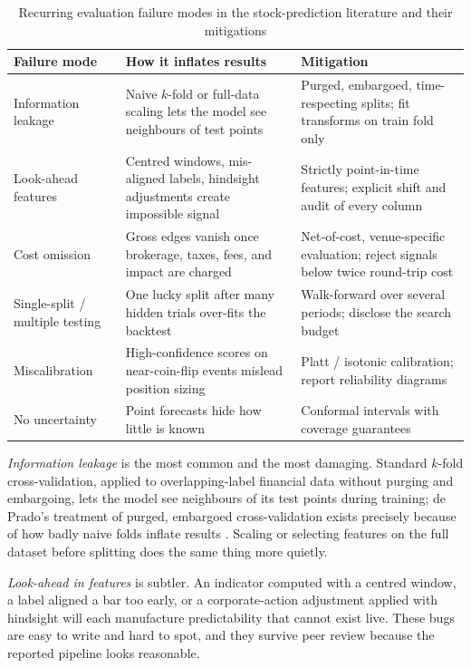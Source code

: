 \documentclass[10pt,a4paper,twocolumn]{article}
\begin{document}
\begin{table}[t]
\centering
\caption{Recurring evaluation failure modes in the stock-prediction literature and their mitigations}
\label{tab:pitfalls}
{\footnotesize
\begin{tabular}{p{3.2cm} p{6.0cm} p{6.2cm}}
\toprule
\textbf{Failure mode} & \textbf{How it inflates results} & \textbf{Mitigation} \\
\midrule
Information leakage & Naive $k$-fold or full-data scaling lets the model see neighbours of test points & Purged, embargoed, time-respecting splits; fit transforms on train fold only \cite{lopezdeprado2018} \\
Look-ahead features & Centred windows, mis-aligned labels, hindsight adjustments create impossible signal & Strictly point-in-time features; explicit shift and audit of every column \\
Cost omission & Gross edges vanish once brokerage, taxes, fees, and impact are charged & Net-of-cost, venue-specific evaluation; reject signals below twice round-trip cost \\
Single-split / multiple testing & One lucky split after many hidden trials over-fits the backtest & Walk-forward over several periods; disclose the search budget \cite{bailey2014,harvey2016} \\
Miscalibration & High-confidence scores on near-coin-flip events mislead position sizing & Platt / isotonic calibration; report reliability diagrams \cite{guo2017,platt1999,zadrozny2002} \\
No uncertainty & Point forecasts hide how little is known & Conformal intervals with coverage guarantees \cite{vovk2005,angelopoulos2023} \\
\bottomrule
\end{tabular}}
\end{table}

\textit{Information leakage} is the most common and the most damaging. Standard $k$-fold cross-validation, applied to overlapping-label financial data without purging and embargoing, lets the model see neighbours of its test points during training; de Prado's treatment of purged, embargoed cross-validation exists precisely because of how badly naive folds inflate results \cite{lopezdeprado2018}. Scaling or selecting features on the full dataset before splitting does the same thing more quietly.

\textit{Look-ahead in features} is subtler. An indicator computed with a centred window, a label aligned a bar too early, or a corporate-action adjustment applied with hindsight will each manufacture predictability that cannot exist live. These bugs are easy to write and hard to spot, and they survive peer review because the reported pipeline looks reasonable.
\end{document}
